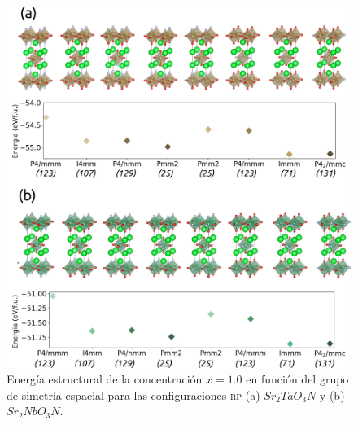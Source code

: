 \begin{figure}[H]
    \centering
    \includegraphics[width=\textwidth]{Figs/rp_ta--nb_U.png}
    \caption{Energía estructural de la concentración $x=1.0$ en función del grupo de simetría espacial para las configuraciones \textsc{rp} (a) $Sr_{2}TaO_{3}N$ y (b) $Sr_{2}NbO_{3}N$.}
    \label{Fig. rp_ta-nb_energy}
\end{figure}

